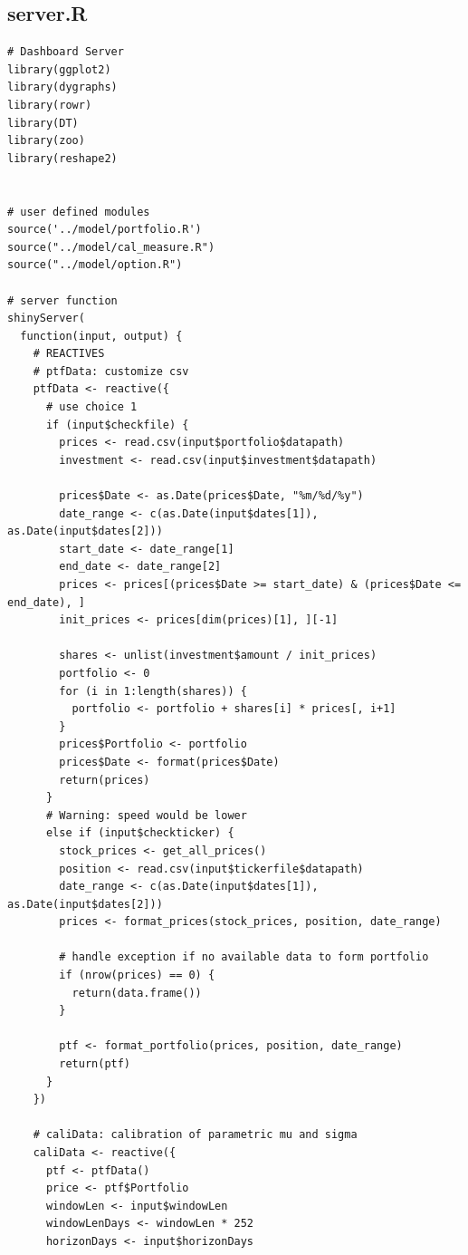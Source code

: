 \documentclass[letterpaper,11pt, oneside]{layout}
\begin{document}
\newpage
\begin{spacing}{1}
\section{server.R}
\label{sec:code:vgg}
\begin{lstlisting}
# Dashboard Server
library(ggplot2)
library(dygraphs)
library(rowr)
library(DT)
library(zoo)
library(reshape2)


# user defined modules
source('../model/portfolio.R')
source("../model/cal_measure.R")
source("../model/option.R")

# server function
shinyServer(
  function(input, output) {
    # REACTIVES
    # ptfData: customize csv
    ptfData <- reactive({
      # use choice 1
      if (input$checkfile) {
        prices <- read.csv(input$portfolio$datapath)
        investment <- read.csv(input$investment$datapath)

        prices$Date <- as.Date(prices$Date, "%m/%d/%y")
        date_range <- c(as.Date(input$dates[1]), as.Date(input$dates[2]))
        start_date <- date_range[1]
        end_date <- date_range[2]
        prices <- prices[(prices$Date >= start_date) & (prices$Date <= end_date), ]
        init_prices <- prices[dim(prices)[1], ][-1]

        shares <- unlist(investment$amount / init_prices)
        portfolio <- 0
        for (i in 1:length(shares)) {
          portfolio <- portfolio + shares[i] * prices[, i+1]
        }
        prices$Portfolio <- portfolio
        prices$Date <- format(prices$Date)
        return(prices)
      } 
      # Warning: speed would be lower
      else if (input$checkticker) {
        stock_prices <- get_all_prices()
        position <- read.csv(input$tickerfile$datapath)
        date_range <- c(as.Date(input$dates[1]), as.Date(input$dates[2]))
        prices <- format_prices(stock_prices, position, date_range)
      
        # handle exception if no available data to form portfolio
        if (nrow(prices) == 0) {
          return(data.frame())
        }
      
        ptf <- format_portfolio(prices, position, date_range)
        return(ptf)
      }
    })

    # caliData: calibration of parametric mu and sigma 
    caliData <- reactive({
      ptf <- ptfData()
      price <- ptf$Portfolio
      windowLen <- input$windowLen
      windowLenDays <- windowLen * 252
      horizonDays <- input$horizonDays


\end{lstlisting}
\end{spacing}
\end{document}
